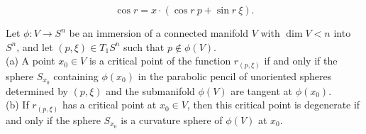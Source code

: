 \documentclass[10pt,a4paper]{amsart}
\begin{document}
\begin{equation}
\label{eq:3.6.3}
\cos r = x \cdot (\cos r\  p + \sin r\  \xi).
\end{equation}

\begin{lemma}
\label{lem:3.6.3} 
Let $\phi:V \rightarrow S^n$ be an immersion of a connected manifold $V$ with $\dim V < n$ into $S^n$, 
and let $(p, \xi) \in T_1S^n$
such that $p \notin \phi (V)$.\\ 
{\rm (a)} A point $x_0 \in V$ is a critical point of the function $r_{(p,\xi)}$ if and only if the sphere
$S_{x_0}$ containing $\phi(x_0)$ in the parabolic pencil of unoriented spheres
determined by $(p,\xi)$ and the submanifold $\phi (V)$ are
tangent at $\phi (x_0)$.\\
{\rm (b)} If $r_{(p,\xi)}$ has a critical point at $x_0 \in V$, then this critical point is degenerate if and only
if the sphere $S_{x_0}$ is a curvature sphere of $\phi (V)$ at $x_0$.
\end{lemma}
\end{document}
